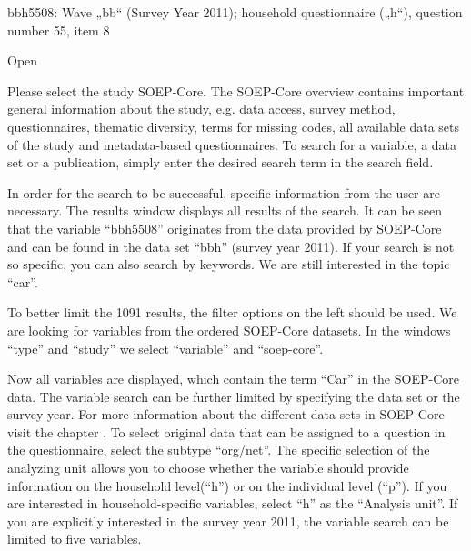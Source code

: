 \documentclass[letterpaper,10pt,openany,onesideH,english]{sphinxmanual}
\begin{document}

bbh5508:  Wave „bb“ (Survey Year 2011); household questionnaire („h“), question number 55, item 8

Open 

\begin{figure}[H]
\centering

\noindent{}
\end{figure}

Please select the study SOEP-Core. The SOEP-Core overview contains important general information about the study, e.g. data access, survey method, questionnaires, thematic diversity, terms for missing codes, all available data sets of the study and metadata-based questionnaires. To search for a variable, a data set or a publication, simply enter the desired search term in the search field.

\begin{figure}[H]
\centering

\noindent{}
\end{figure}

In order for the search to be successful, specific information from the user are necessary. The results window displays all results of the search. It can be seen that the variable “bbh5508” originates from the data provided by SOEP-Core and can be found in the data set “bbh” (survey year 2011). If your search is not so specific, you can also search by keywords. We are still interested in the topic “car”.

\begin{figure}[H]
\centering

\noindent{}
\end{figure}

To better limit the 1091 results, the filter options on the left should be used. We are looking for variables from the ordered SOEP-Core datasets. In the windows “type” and “study” we select “variable” and “soep-core”.

\begin{figure}[H]
\centering

\noindent{}
\end{figure}

Now all variables are displayed, which contain the term “Car” in the SOEP-Core data. The variable search can be further limited by specifying the data set or the survey year. For more information about the different data sets in SOEP-Core visit the chapter {\hyperref[\detokenize{Principles of Data Structure/index:datasets}]{}}. To select original data that can be assigned to a question in the questionnaire, select the subtype “org/net”. The specific selection of the analyzing unit allows you to choose whether the variable should provide information on the household level(“h”) or on the individual level (“p”). If you are interested in household-specific variables, select “h” as the “Analysis unit”. If you are explicitly interested in the survey year 2011, the variable search can be limited to five variables.
\end{document}
